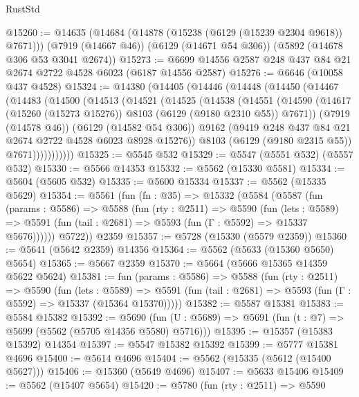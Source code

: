 \begin{lexlean}{RustStd}
\begin{coremodule}
@15260 := @14635
    (@14684 (@14878 (@15238 (@6129 (@15239 @2304 @9618)) @7671)))
    (@7919 (@14667 @46))
    (@6129 (@14671 @54 @306))
    (@5892 (@14678 @306 @53 @3041 @2674))
@15273 := @6699 @14556 @2587 @248 @437 @84 @21 @2674 @2722 @4528 @6023 (@6187 @14556 @2587)
@15276 := @6646 (@10058 @437 @4528)
@15324 := @14380
    (@14405
      (@14446
        (@14448
          (@14450
            (@14467
              (@14483
                (@14500
                  (@14513
                    (@14521
                      (@14525
                        (@14538
                          (@14551
                            (@14590
                              (@14617
                                (@15260 (@15273 @15276))
                                @8103
                                (@6129 (@9180 @2310 @55))
                                @7671))
                            (@7919 (@14578 @46))
                            (@6129 (@14582 @54 @306))
                            @9162
                            (@9419 @248 @437 @84 @21 @2674 @2722 @4528 @6023 @8928 @15276))
                          @8103
                          (@6129 (@9180 @2315 @55))
                          @7671)))))))))))
@15325 := @5545 @532
@15329 := @5547 (@5551 @532) (@5557 @532)
@15330 := @5566 @14353
@15332 := @5562 (@15330 @5581)
@15334 := @5604 (@5605 @532)
@15335 := @5600 @15334
@15337 := @5562 (@15335 @5629)
@15354 := @5561
    (fun (fn : @35) =>
    @15332
      (@5584
        (@5587
          (fun (params : @5586) =>
          @5588
            (fun (rty : @2511) =>
            @5590
              (fun (lets : @5589) =>
              @5591 (fun (tail : @2681) => @5593 (fun (Γ : @5592) => @15337 @5676))))))
        @5722))
    @2359
@15357 := @5728 (@15330 (@5579 @2359))
@15360 := @5641 (@5642 @2359) @14356
@15364 := @5562 (@5633 (@15360 @5650) @5654)
@15365 := @5667 @2359
@15370 := @5664 (@5666 @15365 @14359 @5622 @5624)
@15381 := fun (params : @5586) =>
  @5588
    (fun (rty : @2511) =>
    @5590
      (fun (lets : @5589) =>
      @5591 (fun (tail : @2681) => @5593 (fun (Γ : @5592) => @15337 (@15364 @15370)))))
@15382 := @5587 @15381
@15383 := @5584 @15382
@15392 := @5690
    (fun (U : @5689) => @5691 (fun (t : @7) => @5699 (@5562 (@5705 @14356 @5580) @5716)))
@15395 := @15357 (@15383 @15392) @14354
@15397 := @5547 @15382 @15392
@15399 := @5777 @15381 @4696
@15400 := @5614 @4696
@15404 := @5562 (@15335 (@5612 (@15400 @5627)))
@15406 := @15360 (@5649 @4696)
@15407 := @5633 @15406
@15409 := @5562 (@15407 @5654)
@15420 := @5780
    (fun (rty : @2511) =>
    @5590

\end{coremodule}
\end{lexlean}
